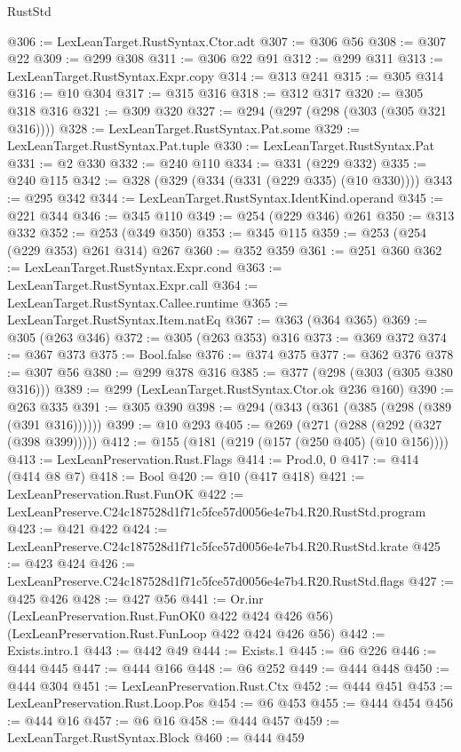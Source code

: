 \begin{lexlean}{RustStd}
\begin{coremodule}
@306 := LexLeanTarget.RustSyntax.Ctor.adt
@307 := @306 @56
@308 := @307 @22
@309 := @299 @308
@311 := @306 @22 @91
@312 := @299 @311
@313 := LexLeanTarget.RustSyntax.Expr.copy
@314 := @313 @241
@315 := @305 @314
@316 := @10 @304
@317 := @315 @316
@318 := @312 @317
@320 := @305 @318 @316
@321 := @309 @320
@327 := @294 (@297 (@298 (@303 (@305 @321 @316))))
@328 := LexLeanTarget.RustSyntax.Pat.some
@329 := LexLeanTarget.RustSyntax.Pat.tuple
@330 := LexLeanTarget.RustSyntax.Pat
@331 := @2 @330
@332 := @240 @110
@334 := @331 (@229 @332)
@335 := @240 @115
@342 := @328 (@329 (@334 (@331 (@229 @335) (@10 @330))))
@343 := @295 @342
@344 := LexLeanTarget.RustSyntax.IdentKind.operand
@345 := @221 @344
@346 := @345 @110
@349 := @254 (@229 @346) @261
@350 := @313 @332
@352 := @253 (@349 @350)
@353 := @345 @115
@359 := @253 (@254 (@229 @353) @261 @314) @267
@360 := @352 @359
@361 := @251 @360
@362 := LexLeanTarget.RustSyntax.Expr.cond
@363 := LexLeanTarget.RustSyntax.Expr.call
@364 := LexLeanTarget.RustSyntax.Callee.runtime
@365 := LexLeanTarget.RustSyntax.Item.natEq
@367 := @363 (@364 @365)
@369 := @305 (@263 @346)
@372 := @305 (@263 @353) @316
@373 := @369 @372
@374 := @367 @373
@375 := Bool.false
@376 := @374 @375
@377 := @362 @376
@378 := @307 @56
@380 := @299 @378 @316
@385 := @377 (@298 (@303 (@305 @380 @316)))
@389 := @299 (LexLeanTarget.RustSyntax.Ctor.ok @236 @160)
@390 := @263 @335
@391 := @305 @390
@398 := @294 (@343 (@361 (@385 (@298 (@389 (@391 @316))))))
@399 := @10 @293
@405 := @269 (@271 (@288 (@292 (@327 (@398 @399)))))
@412 := @155 (@181 (@219 (@157 (@250 @405) (@10 @156))))
@413 := LexLeanPreservation.Rust.Flags
@414 := Prod.{0, 0}
@417 := @414 (@414 @8 @7)
@418 := Bool
@420 := @10 (@417 @418)
@421 := LexLeanPreservation.Rust.FunOK
@422 := LexLeanPreserve.C24c187528d1f71c5fce57d0056e4e7b4.R20.RustStd.program
@423 := @421 @422
@424 := LexLeanPreserve.C24c187528d1f71c5fce57d0056e4e7b4.R20.RustStd.krate
@425 := @423 @424
@426 := LexLeanPreserve.C24c187528d1f71c5fce57d0056e4e7b4.R20.RustStd.flags
@427 := @425 @426
@428 := @427 @56
@441 := Or.inr
    (LexLeanPreservation.Rust.FunOK0 @422 @424 @426 @56)
    (LexLeanPreservation.Rust.FunLoop @422 @424 @426 @56)
@442 := Exists.intro.{1}
@443 := @442 @49
@444 := Exists.{1}
@445 := @6 @226
@446 := @444 @445
@447 := @444 @166
@448 := @6 @252
@449 := @444 @448
@450 := @444 @304
@451 := LexLeanPreservation.Rust.Ctx
@452 := @444 @451
@453 := LexLeanPreservation.Rust.Loop.Pos
@454 := @6 @453
@455 := @444 @454
@456 := @444 @16
@457 := @6 @16
@458 := @444 @457
@459 := LexLeanTarget.RustSyntax.Block
@460 := @444 @459

\end{coremodule}
\end{lexlean}
